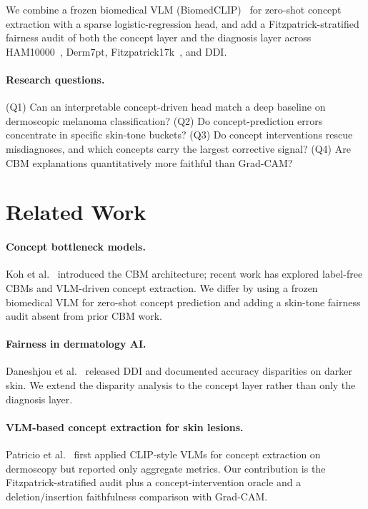 \documentclass[sigconf,nonacm,screen]{acmart}
\begin{document}
We combine a frozen biomedical VLM (BiomedCLIP)~\cite{zhang2023biomedclip}
for zero-shot concept extraction with a sparse logistic-regression head, and
add a Fitzpatrick-stratified fairness audit of both the concept layer and the
diagnosis layer across HAM10000~\cite{tschandl2018ham}, Derm7pt,
Fitzpatrick17k~\cite{groh2021fitz17k}, and DDI.

\paragraph{Research questions.}
(Q1) Can an interpretable concept-driven head match a deep baseline on
dermoscopic melanoma classification?
(Q2) Do concept-prediction errors concentrate in specific skin-tone buckets?
(Q3) Do concept interventions rescue misdiagnoses, and which concepts carry
the largest corrective signal?
(Q4) Are CBM explanations quantitatively more faithful than Grad-CAM?

\section{Related Work}

\paragraph{Concept bottleneck models.}
Koh et al.~\cite{koh2020cbm} introduced the CBM architecture; recent work has
explored label-free CBMs and VLM-driven concept extraction. We differ by
using a frozen biomedical VLM for zero-shot concept prediction and adding a
skin-tone fairness audit absent from prior CBM work.

\paragraph{Fairness in dermatology AI.}
Daneshjou et al.~\cite{daneshjou2022} released DDI and documented accuracy
disparities on darker skin. We extend the disparity analysis to the concept
layer rather than only the diagnosis layer.

\paragraph{VLM-based concept extraction for skin lesions.}
Patricio et al.~\cite{patricio2024vlmcbm} first applied CLIP-style VLMs for
concept extraction on dermoscopy but reported only aggregate metrics. Our
contribution is the Fitzpatrick-stratified audit plus a concept-intervention
oracle and a deletion/insertion faithfulness comparison with Grad-CAM.
\end{document}
